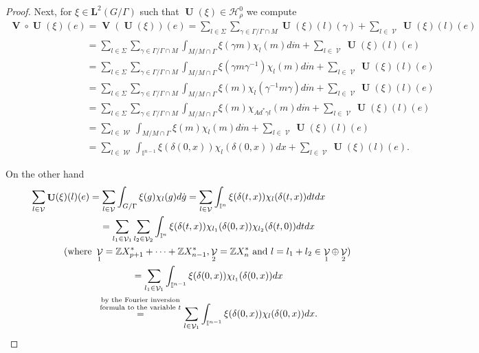 \documentclass[11pt]{article}
\providecommand{\mathds}[1]{\mathbb{#1}}
\DeclareMathOperator{\U}{\mathbf{U}}
\DeclareMathOperator{\V}{\mathbf{V}} \DeclareMathOperator{\Aut}{Aut}
\DeclareMathOperator{\nongen}{\mathcal{V}}
\DeclareMathOperator{\gen}{\mathcal{W}}
\def\tore{{\mathbb I}}
\begin{document}
\begin{proof}
Next, for $\xi\in \mathbf{L}^2(G/\Gamma)$ such that $\U(\xi)\in
\mathscr{H}_\rho^0$ we compute
\begin{gather*}
\V\circ \U(\xi)(e)  = \V(\U(\xi))(e)
 =  \sum_{l\in \Sigma} \sum_{\gamma\in \Gamma/\Gamma\cap M}
\U(\xi)(l)(\gamma)+ \sum
_{l\in \nongen}\U(\xi)(l)(e)\\
 \phantom{\V\circ \U(\xi)(e)}{}
 =  \sum_{l\in \Sigma} \sum_{\gamma\in \Gamma/\Gamma\cap M}
\int_{M/M\cap \Gamma}\xi(\gamma m) \chi_l(m) d\dot{m} + \sum
_{l\in \nongen}\U(\xi)(l)(e)\\
\phantom{\V\circ \U(\xi)(e)}{}
=  \sum_{l\in \Sigma} \sum_{\gamma\in \Gamma/\Gamma\cap M}
\int_{M/M\cap \Gamma} \xi(\gamma m \gamma^{-1} ) \chi_l(m) d\dot{m}
+ \sum
_{l\in \nongen}\U(\xi)(l)(e)\\
\phantom{\V\circ \U(\xi)(e)}{}
=  \sum_{l\in \Sigma} \sum_{\gamma\in \Gamma/\Gamma\cap M}
\int_{M/M\cap \Gamma} \xi( m  ) \chi_l( \gamma^{-1} m \gamma)
d\dot{m} + \sum
_{l\in \nongen}\U(\xi)(l)(e)\\
\phantom{\V\circ \U(\xi)(e)}{}
=  \sum_{l\in \Sigma} \sum_{\gamma\in \Gamma/\Gamma\cap M}
\int_{M/M\cap \Gamma} \xi( m  ) \chi_{Ad^* \gamma l}(  m ) d\dot{m}
+ \sum
_{l\in \nongen}\U(\xi)(l)(e)\\
\phantom{\V\circ \U(\xi)(e)}{}
=  \sum_{l\in \gen}  \int_{M/M\cap \Gamma} \xi( m  ) \chi_l( m )
d\dot{m} + \sum
_{l\in \nongen}\U(\xi)(l)(e)\\
\phantom{\V\circ \U(\xi)(e)}{}
=  \sum_{l\in \gen} \int_{\tore^{n-1}} \xi(\delta(0, x))
\chi_l(\delta(0, x))dx  + \sum _{l\in \nongen}\U(\xi)(l)(e).
\end{gather*}

On the other hand
\begin{gather*}
\sum _{l\in \nongen}\U(\xi)(l)(e) = \sum _{l\in \nongen}
\int_{G/\Gamma} \xi(g) \chi_l(g) d\dot{g}
 = \sum_{l\in \nongen}\int_{\tore^{n}}
    \xi(\delta(t, x))
 \chi_l(\delta(t, x)) dt dx \\
\hphantom{\sum _{l\in \nongen}\U(\xi)(l)(e)}{}
 = \sum_{l_1\in \nongen_1} \sum_{l_2\in \nongen_2} \int_{\tore^{n}}
    \xi(\delta(t, x))
 \chi_{l_1}(\delta(0, x)) \chi_{l_2}(\delta(t, 0) ) dt dx \\
\hphantom{\sum _{l\in \nongen}\U(\xi)(l)(e)}{}
(\text{where } \nongen_1 = \mathds{Z} X_{p+1}^*+\cdots+\mathds{Z}X_{n-1}^*,
     \nongen_2 =\mathds{Z}X_{n}^* \text{ and } l = l_1+l_2
      \in \nongen_1\oplus \nongen_2) \\
\hphantom{\sum _{l\in \nongen}\U(\xi)(l)(e)}{}
= \sum_{l_1\in \nongen_1} \int_{\tore^{n-1}}
    \xi(\delta(0, x))
\chi_{l_1}(\delta(0, x))   dx \\
\hphantom{\sum _{l\in \nongen}\U(\xi)(l)(e)}{}
\overset{\mbox{\scriptsize $\begin{array}{@{}c@{}}\text{by the Fourier inversion} \\ \text{formula to the variable  $t$}\end{array}$}}{=} \sum_{l\in \nongen_1} \int_{\tore^{n-1}}
    \xi(\delta(0, x))
 \chi_{l}(\delta(0, x))  dx.
\end{gather*}


\end{proof}
\end{document}

